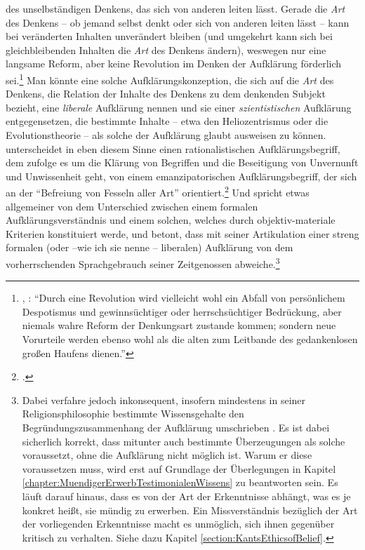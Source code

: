 des unselbständigen Denkens, das sich von anderen leiten lässt. Gerade die
\emph{Art} des Denkens -- ob jemand selbst denkt oder sich von anderen leiten
lässt -- kann bei veränderten Inhalten unverändert bleiben (und umgekehrt kann
sich bei gleichbleibenden Inhalten die \emph{Art} des Denkens
ändern), weswegen nur
eine langsame Reform, aber keine Revolution im Denken der Aufklärung förderlich
sei.\footnote{\cite[Vgl.][A~484]{Kant:BeantwortungderFrage:WasistAufklaerung?1977},
\cite[][VIII: 36.28--33]{Kant:GesammelteWerke1900ff.}: \enquote{Durch eine
Revolution wird vielleicht wohl ein Abfall von persönlichem Despotismus und
gewinnsüchtiger oder herrschsüchtiger Bedrückung, aber niemals wahre Reform der
Denkungsart zustande kommen; sondern neue Vorurteile werden ebenso wohl als die
alten zum Leitbande des gedankenlosen großen Haufens dienen.}} Man könnte eine
solche Aufklärungskonzeption, die sich auf die \emph{Art} des Denkens, die
Relation der Inhalte des Denkens zu dem denkenden Subjekt bezieht, eine
\label{Benennung:LiberaleAufklaerung}\emph{liberale} Aufklärung
nennen und sie einer \emph{szientistischen} Aufklärung entgegensetzen, die bestimmte Inhalte -- etwa den Heliozentrismus
oder die Evolutionstheorie -- als solche der Aufklärung glaubt ausweisen zu
können.
 unterscheidet in eben
diesem Sinne einen rationalistischen Aufklärungsbegriff, dem zufolge es um die
Klärung von Begriffen und die Beseitigung von Unvernunft und Unwissenheit geht, von einem
emanzipatorischen Aufklärungsbegriff, der sich an der \enquote{Befreiung von Fesseln
aller Art}
orientiert.\footcite[Vgl.][7]{Schneiders:DasZeitalterderAufklaerung2005} Und
 spricht etwas allgemeiner von dem
Unterschied zwischen einem formalen Aufklärungsverständnis und einem solchen,
welches durch objektiv-materiale Kriterien konstituiert werde, und betont, dass
 mit seiner Artikulation einer streng formalen (oder --wie
ich sie nenne -- liberalen) Aufklärung von dem vorherrschenden Sprachgebrauch
seiner Zeitgenossen
abweiche.\footnote{\cite[Vgl.][\pno~265\,f.]{Stuke:Aufklaerung1972} Dabei
verfahre  jedoch inkonsequent, insofern mindestens in
seiner Religionsphilosophie bestimmte Wissensgehalte den Begründungszusammenhang
der Aufklärung umschrieben \parencite[vgl.][265--272]{Stuke:Aufklaerung1972}. Es
ist dabei sicherlich korrekt, dass  mitunter auch bestimmte
Überzeugungen als solche voraussetzt, ohne die Aufklärung nicht möglich ist.
Warum er diese voraussetzen muss, wird erst auf Grundlage der Überlegungen in
Kapitel \ref{chapter:MuendigerErwerbTestimonialenWissens} zu beantworten sein.
Es läuft darauf hinaus, dass es von der Art der Erkenntnisse abhängt, was es je
konkret heißt, sie mündig zu erwerben. Ein Missverständnis bezüglich der Art
der vorliegenden Erkenntnisse macht es unmöglich, sich ihnen gegenüber kritisch zu
verhalten. Siehe dazu Kapitel \ref{section:KantsEthicsofBelief}.}
